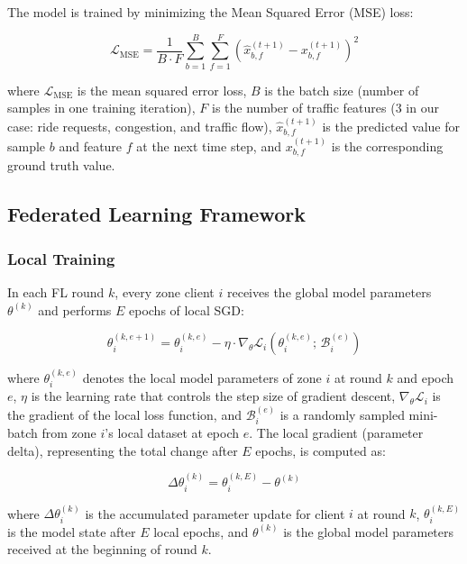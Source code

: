 \documentclass[journal]{IEEEtran}
\begin{document}
The model is trained by minimizing the Mean Squared Error (MSE) loss:

\begin{equation}
\mathcal{L}_{\text{MSE}} = \frac{1}{B \cdot F} \sum_{b=1}^{B} \sum_{f=1}^{F} \left(\hat{x}_{b,f}^{(t+1)} - x_{b,f}^{(t+1)}\right)^2
\label{eq:mse_loss}
\end{equation}

\noindent where $\mathcal{L}_{\text{MSE}}$ is the mean squared error loss, $B$ is the batch size (number of samples in one training iteration), $F$ is the number of traffic features (3 in our case: ride requests, congestion, and traffic flow), $\hat{x}_{b,f}^{(t+1)}$ is the predicted value for sample $b$ and feature $f$ at the next time step, and $x_{b,f}^{(t+1)}$ is the corresponding ground truth value.

\subsection{Federated Learning Framework}

\subsubsection{Local Training}
In each FL round $k$, every zone client $i$ receives the global model parameters $\theta^{(k)}$ and performs $E$ epochs of local SGD:

\begin{equation}
\theta_i^{(k, e+1)} = \theta_i^{(k, e)} - \eta \cdot \nabla_\theta \mathcal{L}_i\left(\theta_i^{(k, e)};\, \mathcal{B}_i^{(e)}\right)
\label{eq:local_sgd}
\end{equation}

\noindent where $\theta_i^{(k, e)}$ denotes the local model parameters of zone $i$ at round $k$ and epoch $e$, $\eta$ is the learning rate that controls the step size of gradient descent, $\nabla_\theta \mathcal{L}_i$ is the gradient of the local loss function, and $\mathcal{B}_i^{(e)}$ is a randomly sampled mini-batch from zone $i$'s local dataset at epoch $e$. The local gradient (parameter delta), representing the total change after $E$ epochs, is computed as:

\begin{equation}
\Delta\theta_i^{(k)} = \theta_i^{(k, E)} - \theta^{(k)}
\label{eq:local_grad}
\end{equation}

\noindent where $\Delta\theta_i^{(k)}$ is the accumulated parameter update for client $i$ at round $k$, $\theta_i^{(k, E)}$ is the model state after $E$ local epochs, and $\theta^{(k)}$ is the global model parameters received at the beginning of round $k$.
\end{document}
